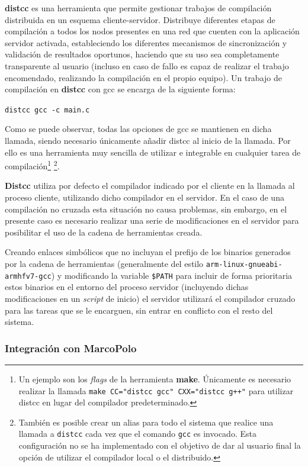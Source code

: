 \textbf{distcc} es una herramienta que permite gestionar trabajos de compilación distribuida en un esquema cliente-servidor. Distribuye diferentes etapas de compilación a todos los nodos presentes en una red que cuenten con la aplicación servidor activada, estableciendo los diferentes mecanismos de sincronización y validación de resultados oportunos, haciendo que su uso sea completamente transparente al usuario (incluso en caso de fallo es capaz de realizar el trabajo encomendado, realizando la compilación en el propio equipo). Un trabajo de compilación en \textbf{distcc} con gcc se encarga de la siguiente forma:

\texttt{distcc gcc -c main.c}

Como se puede observar, todas las opciones de gcc se mantienen en dicha llamada, siendo necesario únicamente añadir distcc al inicio de la llamada. Por ello es una herramienta muy sencilla de utilizar e integrable en cualquier tarea de compilación\footnote{Un ejemplo son los \textit{flags} de la herramienta \textbf{make}. Únicamente es necesario realizar la llamada \texttt{make CC="distcc gcc" CXX="distcc g++"} para utilizar distcc en lugar del compilador predeterminado.} \footnote{También es posible crear un alias para todo el sistema que realice una llamada a \texttt{distcc} cada vez que el comando \texttt{gcc} es invocado. Esta configuración no se ha implementado con el objetivo de dar al usuario final la opción de utilizar el compilador local o el distribuido.}.

\textbf{Distcc} utiliza por defecto el compilador indicado por el cliente en la llamada al proceso cliente, utilizando dicho compilador en el servidor. En el caso de una compilación no cruzada esta situación no causa problemas, sin embargo, en el presente caso es necesario realizar una serie de modificaciones en el servidor para posibilitar el uso de la cadena de herramientas creada.

Creando enlaces simbólicos que no incluyan el prefijo de los binarios generados por la cadena de herramientas (generalmente del estilo \texttt{arm-linux-gnueabi-armhfv7-gcc}) y modificando la variable \texttt{\$PATH} para incluir de forma prioritaria estos binarios en el entorno del proceso servidor (incluyendo dichas modificaciones en un \textit{script} de inicio) el servidor utilizará el compilador cruzado para las tareas que se le encarguen, sin entrar en conflicto con el resto del sistema.
\subsubsection{Integración con MarcoPolo}

